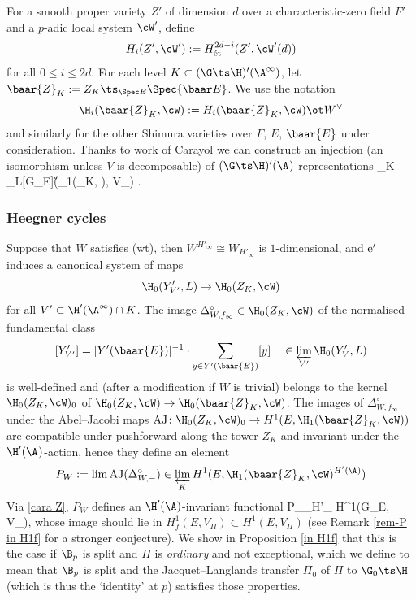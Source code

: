 For a smooth proper variety $Z'$ of dimension $d$ over a characteristic-zero field $F'$ and a $p$-adic local system $\cW'$, define $$H_{i}(Z', \cW') := H^{2d-i}_{\text{\'et}}(Z', \cW'(d))$$
 for all $0\leq i\leq 2d$.       For each level $K\subset (\G\ts\H)'(\A^{\infty}) $, let  $\baar{Z}_{K}:=Z_{K}\ts_{\Spec E}\Spec{\baar E}$.
 We use the notation
$$\H_{i}(\baar{Z}_{K}, \cW):=H_{i}(\baar{Z}_{K}, \cW)\ot W^{\vee}$$
and similarly for the other Shimura varieties over $F$, $E$, $\baar{E}$ under consideration.
Thanks to work of Carayol we can construct an injection (an isomorphism unless $V$ is decomposable) of $(\G\ts\H)'(\A^{})$-representations
\beq
\label{cara Z}
\Pi \into \varinjlim_{K} \Hom_{L[G_{E}]}(\H_{1}(_{K}, \cW), V_{\Pi}) .
\eeq


\subsubsection{Heegner cycles}
 Suppose that $W$ satisfies (wt), then $W^{H'_{\infty}}\cong W_{H'_{\infty}}$ is $1$-dimensional, and ${\rm e'}$ induces   a canonical system of maps
 $$\H_{0}(Y'_{V'}, L)\to \H_{0}(Z_{K}, \cW)$$
  for all $V'\subset \H'(\A^{\infty})\cap K$. The  image $\Delta^{\circ}_{W, f_{\infty}}\in  \H_{0}(Z_{K}, \cW)$  of the normalised fundamental class
$$[Y'_{V'}]= |Y'(\baar{E})|^{-1}\cdot \sum_{y\in Y'(\baar{E})} [y] \quad \in \varprojlim_{V'} \H_{0}(Y'_{V}, L)$$
is well-defined and (after a modification if $W$ is trivial) belongs to the kernel  $\H_{0}(Z_{K}, \cW)_{0}$ of
$  \H_{0}(Z_{K}, \cW)\to \H_{0}(\baar{Z}_{K}, \cW)$.
 The images of $\Delta^{\circ}_{W, f_{\infty}}$ under the Abel--Jacobi maps ${\rm AJ}\colon \H_{0}(Z_{K}, \cW)_{0} \to H^{1}(E, \H_{1}( \baar{Z}_{K}, \cW)) $ are compatible under pushforward along the tower $Z_{K}$ and invariant under the $\H'(\A^{})$-action,  hence they define an element
 $$P_{W}:= \lim {\rm AJ}(\Delta_{W, -}^{\circ})\in \varprojlim_{K} H^{1}(E, \H_{1}(\baar{Z}_{K}, \cW)^{H'(\A^{})})$$
Via  \eqref{cara Z},  $P_{W}$ defines  an $\H'(\A)$-invariant functional
\beq {}
P_{\Pi}\colon \Pi_{H'_{\infty}}
 \to H^{1}(G_{E}, V_{\Pi}),
  \eeq
whose  image should   lie in $H^{1}_{f}(E, V_{\Pi})\subset H^{1}(E, V_{\Pi})$ (see Remark \ref{rem-P in H1f} for a stronger conjecture). We show in Proposition \ref{in H1f} that this is the case if  $\B_{p}$ is split and $\Pi$ is \emph{ordinary} and not exceptional, which we define to mean that $\B_{p}$  is split and the Jacquet--Langlands transfer $\Pi_{0}$ of $\Pi$  to $\G_{0}\ts \H$ (which  is thus the `identity' at $p$) satisfies those properties.


